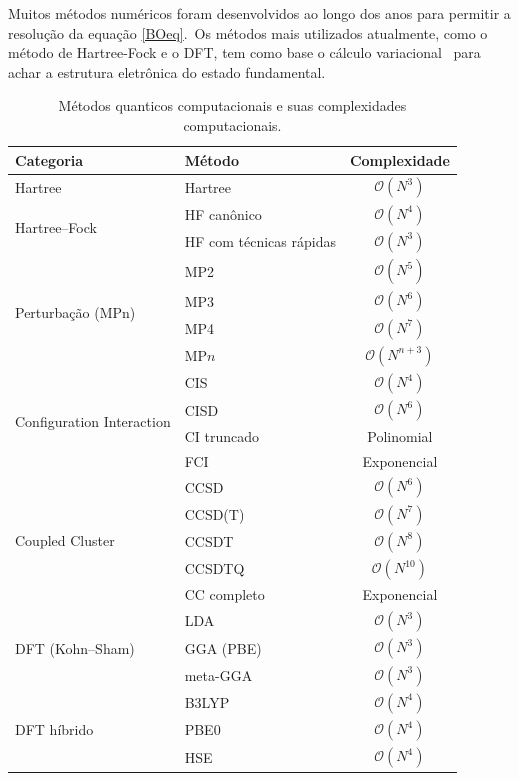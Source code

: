 Muitos métodos numéricos foram desenvolvidos ao longo dos anos para permitir a resolução da equação \ref{BOeq}.\
Os métodos mais utilizados atualmente, como o método de Hartree-Fock e o DFT, tem como base o cálculo variacional \
para achar a estrutura eletrônica do estado fundamental.

\begin{table}[H]
\centering
\caption{Métodos quanticos computacionais e suas complexidades computacionais.}
\label{tab:complexidade_metodos_quanticos}
\begin{tabular}{l l c}
\hline
\textbf{Categoria} & \textbf{Método} & \textbf{Complexidade} \\
\hline
Hartree & Hartree & $\mathcal{O}(N^3)$ \\

\hline
\multirow{2}{*}{Hartree--Fock} 
& HF canônico & $\mathcal{O}(N^4)$ \\
& HF com técnicas rápidas & $\mathcal{O}(N^3)$ \\

\hline
\multirow{4}{*}{Perturbação (MPn)}
& MP2 & $\mathcal{O}(N^5)$ \\
& MP3 & $\mathcal{O}(N^6)$ \\
& MP4 & $\mathcal{O}(N^7)$ \\
& MP$n$ & $\mathcal{O}(N^{n+3})$ \\

\hline
\multirow{4}{*}{Configuration Interaction}
& CIS & $\mathcal{O}(N^4)$ \\
& CISD & $\mathcal{O}(N^6)$ \\
& CI truncado & Polinomial \\
& FCI & Exponencial \\

\hline
\multirow{5}{*}{Coupled Cluster}
& CCSD & $\mathcal{O}(N^6)$ \\
& CCSD(T) & $\mathcal{O}(N^7)$ \\
& CCSDT & $\mathcal{O}(N^8)$ \\
& CCSDTQ & $\mathcal{O}(N^{10})$ \\
& CC completo & Exponencial \\

\hline
\multirow{3}{*}{DFT (Kohn--Sham)}
& LDA & $\mathcal{O}(N^3)$ \\
& GGA (PBE) & $\mathcal{O}(N^3)$ \\
& meta-GGA & $\mathcal{O}(N^3)$ \\

\hline
\multirow{3}{*}{DFT híbrido}
& B3LYP & $\mathcal{O}(N^4)$ \\
& PBE0 & $\mathcal{O}(N^4)$ \\
& HSE & $\mathcal{O}(N^4)$ \\


\end{tabular}
\end{table}
